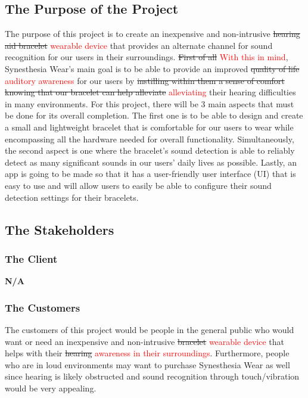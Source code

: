 \documentclass[12pt]{article}
\begin{document}
\subsection{The Purpose of the Project}
The purpose of this project is to create an inexpensive and non-intrusive \sout{hearing aid bracelet} \textcolor{red}{wearable device} 
that provides an alternate channel for sound recognition for our users in their 
surroundings. \sout{First of all} \textcolor{red}{With this in mind}, Synesthesia Wear's main goal is to be able to provide an 
improved \sout{quality of life} \textcolor{red}{auditory awareness} for our users by \sout{instilling within them a sense of comfort 
knowing that our bracelet can help alleviate} \textcolor{red}{alleviating} their hearing difficulties in many environments. 
For this project, there will be 3 main aspects that must be done for its overall completion. 
The first one is to be able to design and create a small and lightweight bracelet that 
is comfortable for our users to wear while encompassing all the hardware needed for 
overall functionality. Simultaneously, the second aspect is one where the bracelet's 
sound detection is able to reliably detect as many significant sounds in our users' daily 
lives as possible. Lastly, an app is going to be made so that it has a user-friendly user interface (UI) that is easy to use and will allow users to easily be able to configure their sound 
detection settings for their bracelets.

\subsection{The Stakeholders}

\subsubsection{The Client}
\textbf{N/A}

\subsubsection{The Customers}
The customers of this project would be people in the general public who would want or 
need an inexpensive and non-intrusive \sout{bracelet} \textcolor{red}{wearable device} that helps with their 
\sout{hearing} \textcolor{red}{awareness in their surroundings}. Furthermore, 
people who are in loud environments may want to purchase Synesthesia Wear as well since 
hearing is likely obstructed and sound recognition through touch/vibration would be very 
appealing.
\end{document}

